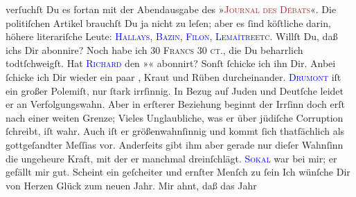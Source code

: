                verſuchſt Du es fortan mit der Abendausgabe des »\textsc{\textcolor{brown}{Journal des Débats}{}\ledrightnote{\textcolor{brown}{Journal des débats}}}«. Die politiſchen Artikel brauchſt Du ja nicht zu leſen; aber es ſind köſtliche
                  \textsc{\label{K_mets_Goldmann_94-partII-666v}\label{K_mets_Goldmann_94-partII-666h}} darin, höhere literariſche Leute: \textsc{\textcolor{blue}{Hallays}{}\ledrightnote{\textcolor{blue}{André Hallays}}, \textcolor{blue}{Bazin}{}\ledrightnote{\textcolor{blue}{René Bazin}}, \textcolor{blue}{Filon}{}\ledrightnote{\textcolor{blue}{Augustin Filon}}, \textcolor{blue}{Lemaître}{}\ledrightnote{\textcolor{blue}{Jules Lemaître}}{ }}\textsc{etc}. Willſt Du, daß ichs Dir abonnire? Noch habe ich \textsc{30 Francs 30 ct.}, die Du beharrlich todtſchweigſt. Hat \textsc{\textcolor{blue}{Richard}{}\ledrightnote{\textcolor{blue}{Richard Beer-Hofmann}}} den »\label{K_L02630-66v}\label{K_L02630-66h}« abonnirt? Sonſt
               ſchicke ich ihn Dir. Anbei ſchicke ich Dir wieder ein paar \label{K_mets_Goldmann_94-partII-55v}\label{K_mets_Goldmann_94-partII-55h}, Kraut und Rüben durcheinander. \textsc{\textcolor{blue}{Drumont}{}\ledrightnote{\textcolor{blue}{Édouard Drumont}}} iſt ein großer {\pb}Polemiſt, nur ſtark irrſinnig.
               In Bezug auf Juden und Deutſche leidet er an Verfolgungswahn. Aber in erſterer
               Beziehung beginnt der Irrſinn doch erſt nach einer weiten Grenze; Vieles
               Unglaubliche, was er über jüdiſche Corruption ſchreibt, iſt wahr. Auch iſt er
               größenwahnſinnig und kommt ſich thatſächlich als gottgeſandter Meſſias vor.
               Anderſeits gibt ihm aber gerade nur dieſer Wahnſinn die ungeheure Kraft, mit der er
               manchmal dreinſchlägt.\pend
           \pstart
           {\pb}\textsc{\textcolor{blue}{Sokal}{}\ledrightnote{\textcolor{blue}{Clemens Sokal}}} war bei mir; er gefällt mir gut. Scheint ein geſcheiter und ernſter Menſch zu
                  ſein{\dotsfour}\pend
           \pstart
           Ich wünſche Dir von Herzen Glück zum neuen Jahr. Mir ahnt, daß das Jahr
